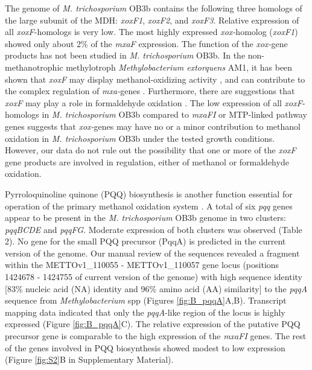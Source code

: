 The genome of \textit{M. trichosporium} OB3b contains the following three homologs of the large subunit of the MDH: \textit{xoxF1}, \textit{xoxF2}, and \textit{xoxF3}.
Relative expression of all \textit{xoxF}-homologs is very low.
The most highly expressed \textit{xox-}homolog (\textit{xoxF1}) showed only about 2\% of the \textit{mxaF} expression.
The function of the \textit{xox-}gene products has not been studied in \textit{M. trichosporium} OB3b.
In the non-methanotrophic methylotroph \textit{Methylobacterium extorquens} AM1, it has been shown that \textit{xoxF} may display methanol-oxidizing activity \cite{schmidt2010}, and can contribute to the complex regulation of \textit{mxa-}genes \cite{skovran2011}.
Furthermore, there are suggestions that \textit{xoxF} may play a role in formaldehyde oxidation \cite{wilson2008}.
The low expression of all \textit{xoxF}-homologs in \textit{M. trichosporium} OB3b compared to \textit{mxaFI} or MTP-linked pathway genes suggests that \textit{xox-}genes may have no or a minor contribution to methanol oxidation in \textit{M. trichosporium} OB3b under the tested growth conditions.
However, our data do not rule out the possibility that one or more of the \textit{xoxF} gene products are involved in regulation, either of methanol or formaldehyde oxidation.

Pyrroloquinoline quinone (PQQ) biosynthesis is another function essential for operation of the primary methanol oxidation system \cite{toyama1997, anthony2002}.
A total of six \textit{pqq} genes appear to be present in the \textit{M. trichosporium} OB3b genome in two clusters: \textit{pqqBCDE} and \textit{pqqFG}.
Moderate expression of both clusters was observed (Table 2).
No gene for the small PQQ precursor (PqqA) is predicted in the current version of the genome.
Our manual review of the sequences revealed a fragment within the METTOv1\_110055 - METTOv1\_110057 gene locus (positions 1424678 - 1424755 of current version of the genome) with high sequence identity [83\% nucleic acid (NA) identity and 96\% amino acid (AA) similarity] to the \textit{pqqA} sequence from \textit{Methylobacterium} spp (Figures \ref{fig:B_pqqA}A,B).
Transcript mapping data indicated that only the \textit{pqqA}-like region of the locus is highly expressed (Figure \ref{fig:B_pqqA}C).
The relative expression of the putative PQQ precursor gene is comparable to the high expression of the \textit{mxaFI} genes.
The rest of the genes involved in PQQ biosynthesis showed modest to low expression (Figure \ref{fig:S2}B in Supplementary Material).

